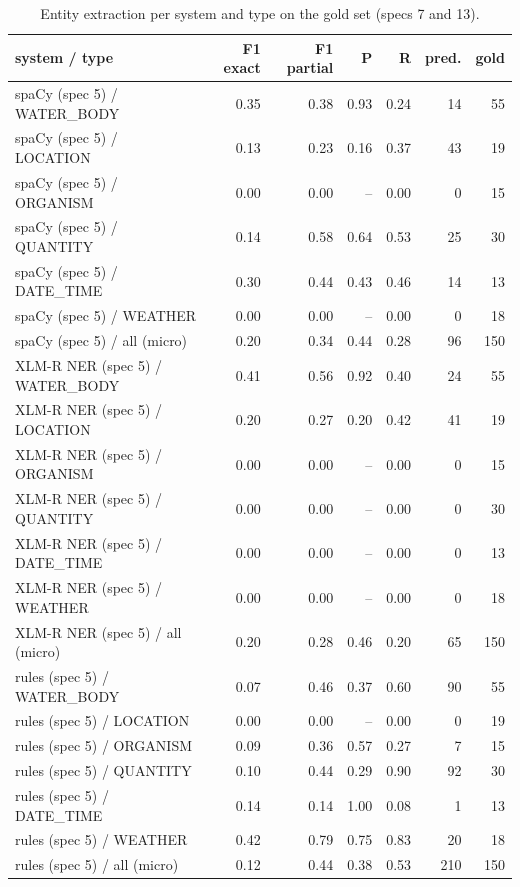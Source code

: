 \begin{table}[htbp]
\centering
\small
\caption{Entity extraction per system and type on the gold set (specs 7 and 13).}
\label{tab:entities-type}
\begin{tabular}{lrrrrrr}
\toprule
system / type & F1 exact & F1 partial & P & R & pred. & gold \\
\midrule
spaCy (spec 5) / WATER\_BODY & 0.35 & 0.38 & 0.93 & 0.24 & 14 & 55 \\
spaCy (spec 5) / LOCATION & 0.13 & 0.23 & 0.16 & 0.37 & 43 & 19 \\
spaCy (spec 5) / ORGANISM & 0.00 & 0.00 & -- & 0.00 & 0 & 15 \\
spaCy (spec 5) / QUANTITY & 0.14 & 0.58 & 0.64 & 0.53 & 25 & 30 \\
spaCy (spec 5) / DATE\_TIME & 0.30 & 0.44 & 0.43 & 0.46 & 14 & 13 \\
spaCy (spec 5) / WEATHER & 0.00 & 0.00 & -- & 0.00 & 0 & 18 \\
spaCy (spec 5) / all (micro) & 0.20 & 0.34 & 0.44 & 0.28 & 96 & 150 \\
XLM-R NER (spec 5) / WATER\_BODY & 0.41 & 0.56 & 0.92 & 0.40 & 24 & 55 \\
XLM-R NER (spec 5) / LOCATION & 0.20 & 0.27 & 0.20 & 0.42 & 41 & 19 \\
XLM-R NER (spec 5) / ORGANISM & 0.00 & 0.00 & -- & 0.00 & 0 & 15 \\
XLM-R NER (spec 5) / QUANTITY & 0.00 & 0.00 & -- & 0.00 & 0 & 30 \\
XLM-R NER (spec 5) / DATE\_TIME & 0.00 & 0.00 & -- & 0.00 & 0 & 13 \\
XLM-R NER (spec 5) / WEATHER & 0.00 & 0.00 & -- & 0.00 & 0 & 18 \\
XLM-R NER (spec 5) / all (micro) & 0.20 & 0.28 & 0.46 & 0.20 & 65 & 150 \\
rules (spec 5) / WATER\_BODY & 0.07 & 0.46 & 0.37 & 0.60 & 90 & 55 \\
rules (spec 5) / LOCATION & 0.00 & 0.00 & -- & 0.00 & 0 & 19 \\
rules (spec 5) / ORGANISM & 0.09 & 0.36 & 0.57 & 0.27 & 7 & 15 \\
rules (spec 5) / QUANTITY & 0.10 & 0.44 & 0.29 & 0.90 & 92 & 30 \\
rules (spec 5) / DATE\_TIME & 0.14 & 0.14 & 1.00 & 0.08 & 1 & 13 \\
rules (spec 5) / WEATHER & 0.42 & 0.79 & 0.75 & 0.83 & 20 & 18 \\
rules (spec 5) / all (micro) & 0.12 & 0.44 & 0.38 & 0.53 & 210 & 150 \\

\end{tabular}
\end{table}
